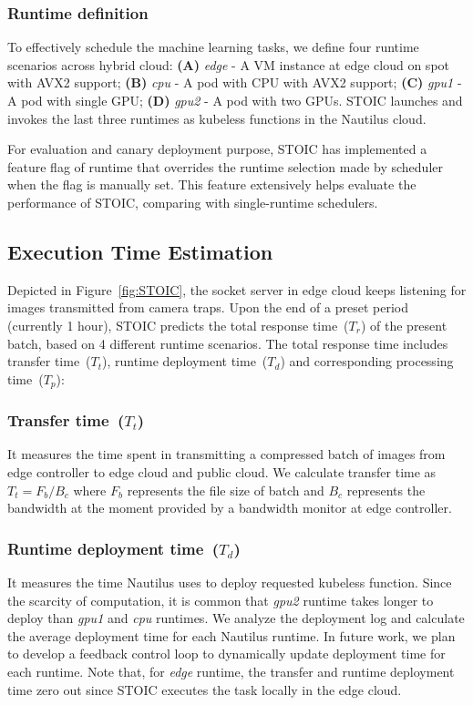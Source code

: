  \BlankLine
 \subsubsection{Runtime definition}
 To effectively schedule the machine learning tasks, we define four runtime scenarios across hybrid cloud: \textbf{(A)} \textit{edge} - A VM instance at edge cloud on spot with AVX2 support; \textbf{(B)} \textit{cpu} - A pod with CPU with AVX2 support; \textbf{(C)} \textit{gpu1} - A pod with single GPU; \textbf{(D)} \textit{gpu2} - A pod with two GPUs. STOIC launches and invokes the last three runtimes as kubeless functions in the Nautilus cloud. 
 
 For evaluation and canary deployment purpose, STOIC has implemented a feature flag of runtime that overrides the runtime selection made by scheduler when the flag is manually set. This feature extensively helps evaluate the performance of STOIC, comparing with single-runtime schedulers.
 
 
 \subsection{Execution Time Estimation}
 Depicted in Figure~\ref{fig:STOIC}, the socket server in edge cloud keeps listening for images transmitted from camera traps. Upon the end of a preset period (currently 1 hour), STOIC predicts the total response time~($T_r$) of the present batch, based on 4 different runtime scenarios. The total response time includes transfer time~($T_t$), runtime deployment time~($T_d$) and corresponding processing time~($T_p$): 
 
 \subsubsection{Transfer time~($T_t$)} It measures the time spent in transmitting a compressed batch of images from edge controller to edge cloud and public cloud. We calculate transfer time as ${T_t = F_b / B_c}$ where $F_b$ represents the file size of batch and $B_c$ represents the bandwidth at the moment provided by a bandwidth monitor at edge controller. 
 
 \subsubsection{Runtime deployment time~($T_d$)} It measures the time Nautilus uses to deploy requested kubeless function. Since the scarcity of computation, it is common that \textit{gpu2} runtime takes longer to deploy than \textit{gpu1} and \textit{cpu} runtimes. We analyze the deployment log and calculate the average deployment time for each Nautilus runtime. In future work, we plan to develop a feedback control loop to dynamically update deployment time for each runtime. Note that, for \textit{edge} runtime, the transfer and runtime deployment time zero out since STOIC executes the task locally in the edge cloud.
 
